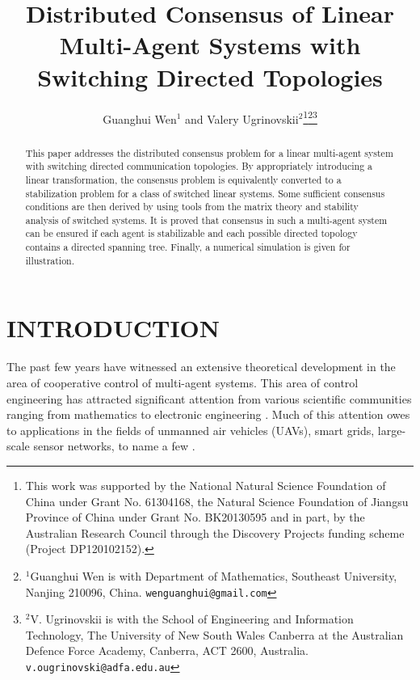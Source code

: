 \documentclass[letterpaper, 10 pt, conference]{ieeeconf}
\title{\LARGE \bf
Distributed Consensus of Linear Multi-Agent Systems with Switching Directed Topologies
}
\author{Guanghui Wen$^{1}$ and Valery Ugrinovskii$^{2}$\thanks{This work was supported by the National Natural Science Foundation
  of China under Grant No. 61304168, the Natural Science
Foundation of Jiangsu Province of China under Grant No. BK20130595 and in
part, by the Australian Research Council through the Discovery Projects
funding scheme (Project DP120102152).}\thanks{$^{1}$Guanghui Wen is with Department of Mathematics, Southeast University,
Nanjing 210096, China.
        {\tt\small wenguanghui@gmail.com}}\thanks{$^{2}$V. Ugrinovskii is with the School of Engineering
and Information Technology, The University of New South Wales Canberra at
the Australian Defence Force Academy, Canberra, ACT 2600, Australia.
{\tt\small v.ougrinovski@adfa.edu.au}}}
\begin{document}
\maketitle
\thispagestyle{empty}
\pagestyle{empty}


\begin{abstract}
This paper addresses the distributed consensus
problem for a linear multi-agent system with switching directed communication
topologies. By appropriately introducing a linear transformation,
the consensus problem is equivalently converted to a stabilization problem for a class of switched linear systems. Some sufficient consensus conditions are then
derived by using tools from the matrix theory and stability analysis of
switched systems. It is proved that consensus
 in such a multi-agent system can be ensured if each agent is stabilizable
 and each possible directed topology contains a directed spanning
 tree. Finally, a numerical simulation is given for illustration.
\end{abstract}


\section{INTRODUCTION}
The past few years have witnessed an extensive theoretical development in
the area of cooperative control of multi-agent systems. This area of
control engineering has attracted significant
attention from various scientific communities ranging from mathematics to electronic engineering \cite{SaberFaxMurray2007Survey,RenBeardAtkins2007Survey}.
Much of this attention owes to applications
in the fields of unmanned air vehicles (UAVs), smart grids, large-scale
sensor networks, to name a few
\cite{RenBeardAtkins2007Survey,Ugrinovskii2011Automatica,MeiZhangCaoBook2011}.

\par
\end{document}
